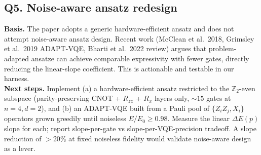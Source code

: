 \subsection*{Q5. Noise-aware ansatz redesign}
\textbf{Basis.} The paper adopts a generic hardware-efficient ansatz and does not attempt noise-aware
ansatz design. Recent work (McClean et al.\ 2018, Grimsley et al.\ 2019 ADAPT-VQE, Bharti et al.\ 2022
review) argues that problem-adapted ansatze can achieve comparable expressivity with fewer gates,
directly reducing the linear-slope coefficient. This is actionable and testable in our harness.
\\
\textbf{Next steps.} Implement (a) a hardware-efficient ansatz restricted to the $\mathbb{Z}_2$-even
subspace (parity-preserving CNOT + $R_{zz}$ + $R_x$ layers only, $\sim 15$ gates at $n{=}4, d{=}2$),
and (b) an ADAPT-VQE built from a Pauli pool of $\{Z_iZ_j, X_i\}$ operators grown greedily until
noiseless $E/E_0 \ge 0.98$. Measure the linear $\Delta E(p)$ slope for each; report
slope-per-gate vs slope-per-VQE-precision tradeoff. A slope reduction of $>20\%$ at fixed noiseless
fidelity would validate noise-aware design as a lever.
